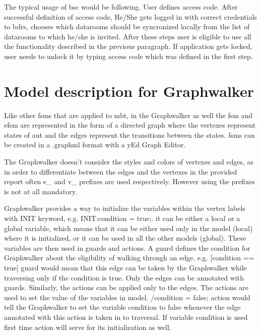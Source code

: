 \par
The typical usage of \acrshort{bsc} would be following. User defines access code. After successful definition of access code, He/She gets logged in with correct credentials to \acrshort{bdrs}, chooses which datarooms should be syncronized locally from the list of datarooms to which he/she is invited. After these steps user is eligible to use all the functionality described in the previous paragraph. If application gets locked, user needs to unlock it by typing access code which was defined in the first step.


\section{Model description for Graphwalker}
\par
Like other \acrshort{fsm}s that are applied to \acrshort{mbt}, in the Graphwalker as well the \acrshort{fsm} and \acrshort{efsm} are represented in the form of a directed graph where the vertexes represent states of \acrshort{aut} and the edges represent the transitions between the states. \acrshort{fsm}s can be created in a .graphml format with a yEd Graph Editor.

\par
The Graphwalker doesn't consider the styles and colors of vertexes and edges, as in order to differentiate between the edges and the vertexes in the provided report often e\_ and v\_ prefixes are used respectively. However using the prefixes is not at all mandatory.

\par
Graphwalker provides a way to initialize the variables within the vertex labels with INIT keyword, e.g. INIT:condition = true;. it can be either a local or a global variable, which means that it can be either used only in the model (local) where it is initialized, or it can be used in all the other models (global). These variables are then used in guards and actions. A guard defines the condition for Graphwalker about the eligibility of walking through an edge. e.g. [condition == true] guard would mean that this edge can be taken by the Graphwalker while traversing only if the condition is true. Only the edges can be annotated with guards. Similarly, the actions can be applied only to the edges. The actions are used to set the value of the variables in model. /condition = false; action would tell the Graphwalker to set the variable condition to false whenever the edge annotated with this action is taken in to traversal. If variable condition is used first time action will serve for its initialization as well. 

